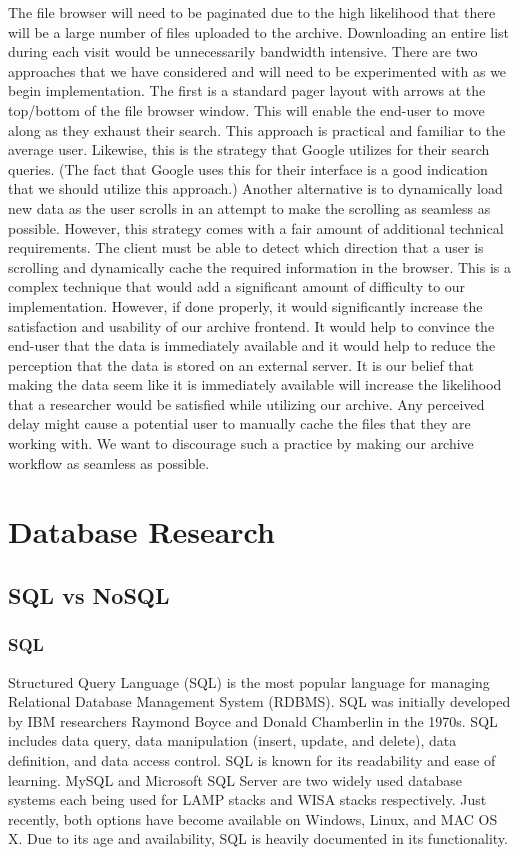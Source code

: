 \documentclass[12pt]{report}
\begin{document}
The file browser will need to be paginated due to the high likelihood that there will be a large number of files uploaded to the archive. Downloading an entire list during each visit would be unnecessarily bandwidth intensive. There are two approaches that we have considered and will need to be experimented with as we begin implementation. The first is a standard pager layout with arrows at the top/bottom of the file browser window. This will enable the end-user to move along as they exhaust their search. This approach is practical and familiar to the average user. Likewise, this is the strategy that Google utilizes for their search queries. (The fact that Google uses this for their interface is a good indication that we should utilize this approach.) Another alternative is to dynamically load new data as the user scrolls in an attempt to make the scrolling as seamless as possible. However, this strategy comes with a fair amount of additional technical requirements. The client must be able to detect which direction that a user is scrolling and dynamically cache the required information in the browser. This is a complex technique that would add a significant amount of difficulty to our implementation. However, if done properly, it would significantly increase the satisfaction and usability of our archive frontend. It would help to convince the end-user that the data is immediately available and it would help to reduce the perception that the data is stored on an external server. It is our belief that making the data seem like it is immediately available will increase the likelihood that a researcher would be satisfied while utilizing our archive. Any perceived delay might cause a potential user to manually cache the files that they are working with. We want to discourage such a practice by making our archive workflow as seamless as possible. 

\section*{Database Research}

\subsection*{SQL vs NoSQL}

\subsubsection*{SQL}

Structured Query Language (SQL) is the most popular language for managing Relational Database Management System (RDBMS).  SQL was initially developed by IBM researchers Raymond Boyce and Donald Chamberlin in the 1970s.  SQL includes data query, data manipulation (insert, update, and delete), data definition, and data access control.  SQL is known for its readability and ease of learning.  MySQL and Microsoft SQL Server are two widely used database systems each being used for LAMP stacks and WISA stacks respectively.  Just recently, both options have become available on Windows, Linux, and MAC OS X.  Due to its age and availability, SQL is heavily documented in its functionality.
\end{document}
